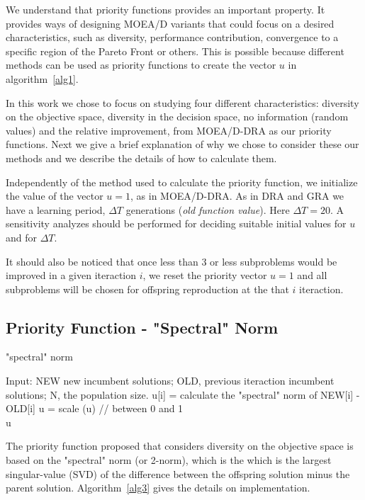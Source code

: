 We understand that priority functions provides an important property. It provides ways of designing MOEA/D variants that could focus on a desired characteristics, such as diversity, performance contribution, convergence to a specific region of the Pareto Front or others. This is possible because different methods can be used as priority functions to create the vector $u$ in algorithm~\ref{alg1}. 

In this work we chose to focus on studying four different characteristics: diversity on the objective space, diversity in the decision space, no information (random values) and the relative improvement, from MOEA/D-DRA as our priority functions. Next we give a brief explanation of why we chose to consider these  our methods and we describe the details of how to calculate them.

Independently of the method used to calculate the priority function, we initialize the value of the vector $u=1$, as in MOEA/D-DRA. As in DRA and GRA we have a learning period, $\Delta T$ generations (\textit{old function value}). Here $\Delta T=20$.   A sensitivity analyzes should be performed for deciding suitable initial values for $u$ and for $\Delta T$.

 It should also be noticed that once less than $3$ or less subproblems would be improved in a given iteraction $i$, we reset the priority vector $u = 1$  and all subproblems will be chosen for offspring reproduction at the that $i$ iteraction.

\subsection{Priority Function - "Spectral" Norm} 

\begin{algorithm}[t]
	\caption{"spectral" norm}\label{alg3}
	\begin{algorithmic}[1]
		
		\State Input: NEW new incumbent solutions; OLD, previous iteraction incumbent solutions; N, the population size.
		\State u[i] = calculate the "spectral" norm of NEW[i] - OLD[i]
		\EndFor
		\State u = scale (u) // between 0 and 1\\
	\Return u
	\end{algorithmic}
\end{algorithm}

The priority function proposed that considers diversity on the objective space is based on the "spectral" norm (or 2-norm), which is the which is the largest singular-value (SVD) of the difference between the offspring solution minus the parent solution. Algorithm~\ref{alg3} gives the details on implementation. 

